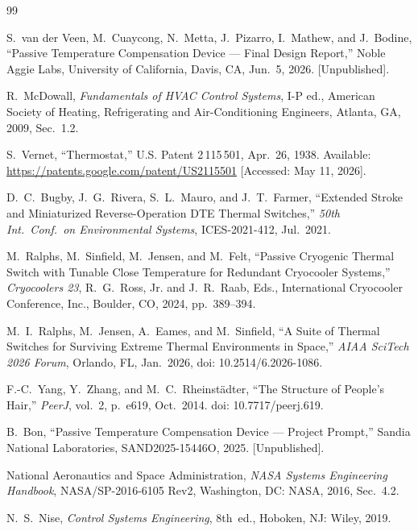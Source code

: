 \documentclass[12pt, letterpaper]{report}%
\begin{document}
\begin{thebibliography}{99}

	S.\ van der Veen, M.\ Cuaycong, N.\ Metta, J.\ Pizarro, I.\ Mathew, and J.\ Bodine,
	``Passive Temperature Compensation Device --- Final Design Report,''
	Noble Aggie Labs, University of California, Davis, CA, Jun.\ 5, 2026. [Unpublished].

	R.\ McDowall, \textit{Fundamentals of HVAC Control Systems}, I-P ed.,
	American Society of Heating, Refrigerating and Air-Conditioning Engineers,
	Atlanta, GA, 2009, Sec.~1.2.

	S.\ Vernet, ``Thermostat,'' U.S. Patent 2\,115\,501, Apr.\ 26, 1938.
	Available: \url{https://patents.google.com/patent/US2115501}
	[Accessed: May 11, 2026].

	D.\ C.\ Bugby, J.\ G.\ Rivera, S.\ L.\ Mauro, and J.\ T.\ Farmer,
	``Extended Stroke and Miniaturized Reverse-Operation DTE Thermal Switches,''
	\textit{50th Int.\ Conf.\ on Environmental Systems}, ICES-2021-412, Jul.\ 2021.

	M.\ Ralphs, M.\ Sinfield, M.\ Jensen, and M.\ Felt,
	``Passive Cryogenic Thermal Switch with Tunable Close Temperature for
	Redundant Cryocooler Systems,''
	\textit{Cryocoolers 23}, R.\ G.\ Ross, Jr. and J.\ R.\ Raab, Eds.,
	International Cryocooler Conference, Inc., Boulder, CO, 2024, pp.~389--394.

	M.\ I.\ Ralphs, M.\ Jensen, A.\ Eames, and M.\ Sinfield,
	``A Suite of Thermal Switches for Surviving Extreme Thermal Environments in Space,''
	\textit{AIAA SciTech 2026 Forum}, Orlando, FL, Jan.\ 2026,
	doi: 10.2514/6.2026-1086.

	F.-C.\ Yang, Y.\ Zhang, and M.\ C.\ Rheinstädter,
	``The Structure of People's Hair,''
	\textit{PeerJ}, vol.~2, p.~e619, Oct.\ 2014. doi: 10.7717/peerj.619.

	B.\ Bon,
	``Passive Temperature Compensation Device --- Project Prompt,''
	Sandia National Laboratories, SAND2025-15446O, 2025. [Unpublished].

	National Aeronautics and Space Administration,
	\textit{NASA Systems Engineering Handbook}, NASA/SP-2016-6105 Rev2,
	Washington, DC: NASA, 2016, Sec.~4.2.

	N.\ S.\ Nise, \textit{Control Systems Engineering},
	8th~ed., Hoboken, NJ: Wiley, 2019.


\end{thebibliography}
\end{document}
